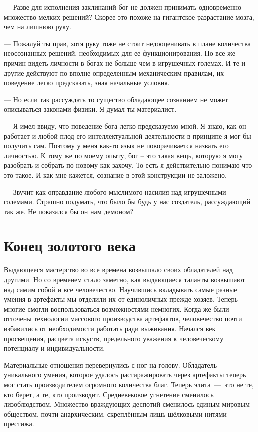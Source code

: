 \documentclass[12pt,a4paper]{article}
\begin{document}
--- Разве для исполнения заклинаний бог не должен принимать одновременно множество мелких решений? Скорее это похоже на гигантское разрастание мозга, чем на лишнюю руку.

--- Пожалуй ты прав, хотя руку тоже не стоит недооценивать в плане количества неосознанных решений, необходимых для ее функционирования. Но все же причин видеть личности в богах не больше чем в игрушечных големах. И те и другие действуют по вполне определенным механическим правилам, их поведение легко предсказать, зная начальные условия.

--- Но если так рассуждать то существо обладающее сознанием не может описываться законами физики. Я думал ты материалист.

--- Я имел ввиду, что поведение бога легко предсказуемо мной. Я знаю, как он работает и любой плод его интеллектуальной деятельности в принципе я мог бы получить сам. Поэтому у меня как-то язык не поворачивается назвать его личностью. К тому же по моему опыту, бог -- это такая вещь, которую я могу разобрать и собрать по-новому как захочу. То есть я действительно понимаю что это такое. И как мне кажется, сознание в этой конструкции не заложено.

--- Звучит как оправдание любого мыслимого насилия над игрушечными големами. Страшно подумать, что было бы будь у нас создатель, рассуждающий так же. Не показался бы он нам демоном?

\section*{Конец золотого века}


Выдающееся мастерство во все времена возвышало своих обладателей над другими. Но со временем стало заметно, как выдающиеся таланты возвышают над самим собой и все человечество. 
Научившись вкладывать самые разные умения в артефакты мы отделили их от единоличных прежде хозяев. Теперь многие смогли воспользоваться возможностями немногих. Когда же были отточены технологии массового производства артефактов, человечество почти избавились от необходимости работать ради выживания. Начался век просвещения, расцвета искуств, предельного уважения к человеческому потенциалу и индивидуальности. 

Материальные отношения перевернулись с ног на голову. Обладатель уникального умения, которое удалось растиражировать через артефакты теперь мог стать производителем огромного количества благ. Теперь элита~---~это не те, кто берет, а те, кто производит. Средневековое угнетение сменилось лизоблюдством. Множество враждующих деспотий сменилось единым мировым обществом, почти анархическим, скреплённым лишь шёлковыми нитями престижа.
\end{document}
